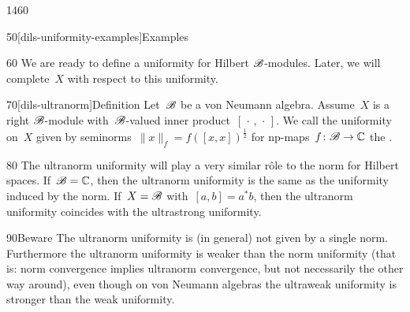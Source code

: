 \begin{parsec}{1460}
\begin{point}{50}[dils-uniformity-examples]{Examples}
\begin{enumerate}
    \end{enumerate}
\begin{point}{60}%
We are ready to define a uniformity for Hilbert $\mathscr{B}$-modules.
Later, we will complete~$X$ with respect to this uniformity.
\end{point}
\end{point}
\begin{point}{70}[dils-ultranorm]{Definition}%
Let~$\mathscr{B}$ be a von Neumann algebra.
Assume~$X$ is a right $\mathscr{B}$-module
    with~$\mathscr{B}$-valued inner product~$[\,\cdot\,,\,\cdot\,]$.
We call the uniformity on~$X$
    given by seminorms~$\|x\|_f = f([x,x])^{\frac{1}{2}}$
    for np-maps~$f\colon \mathscr{B} \to \mathbb{C}$
    the .
\begin{point}{80}%
The ultranorm uniformity will play a very similar r\^ole
    to the norm for Hilbert spaces.
If~$\mathscr{B}=\mathbb{C}$, then the ultranorm uniformity is
    the same as the uniformity induced by the norm.
If~$X=\mathscr{B}$ with~$[a,b]=a^*b$,
    then the ultranorm uniformity coincides with the ultrastrong uniformity.
\end{point}
\begin{point}{90}{Beware}%
    The ultranorm uniformity is (in general) not given by a single norm.
    Furthermore the ultranorm uniformity is weaker than the norm uniformity
        (that is: norm convergence implies ultranorm convergence,
            but not necessarily the other way around),
        even though on von Neumann algebras the
        ultraweak uniformity
        is stronger than the weak uniformity.
\end{point}
\end{point}
\end{parsec}

